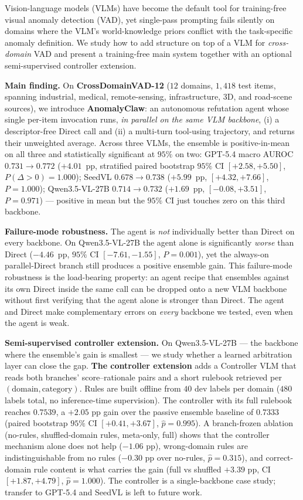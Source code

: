 Vision-language models (VLMs) have become the default tool for training-free visual anomaly detection (VAD), yet single-pass prompting fails silently on domains where the VLM's world-knowledge priors conflict with the task-specific anomaly definition. We study how to add structure on top of a VLM for \emph{cross-domain} VAD and present a training-free main system together with an optional semi-supervised controller extension.

\textbf{Main finding.} On \textbf{CrossDomainVAD-12} ($12$ domains, $1{,}418$ test items, spanning industrial, medical, remote-sensing, infrastructure, 3D, and road-scene sources), we introduce \textbf{AnomalyClaw}: an autonomous refutation agent whose single per-item invocation runs, \emph{in parallel on the same VLM backbone}, (i) a descriptor-free Direct call and (ii) a multi-turn tool-using trajectory, and returns their unweighted average. Across three VLMs, the ensemble is positive-in-mean on all three and statistically significant at $95\%$ on two: GPT-5.4 macro AUROC $0.731\!\to\!0.772$ ($+4.01$~pp, stratified paired bootstrap $95\%$ CI $[+2.58,+5.50]$, $P(\Delta\!>\!0){=}1.000$); SeedVL $0.678\!\to\!0.738$ ($+5.99$~pp, $[+4.32,+7.66]$, $P{=}1.000$); Qwen3.5-VL-27B $0.714\!\to\!0.732$ ($+1.69$~pp, $[-0.08,+3.51]$, $P{=}0.971$) --- positive in mean but the $95\%$ CI just touches zero on this third backbone.

\textbf{Failure-mode robustness.} The agent is \emph{not} individually better than Direct on every backbone. On Qwen3.5-VL-27B the agent alone is significantly \emph{worse} than Direct ($-4.46$~pp, $95\%$ CI $[-7.61,-1.55]$, $P{=}0.001$), yet the always-on parallel-Direct branch still produces a positive ensemble gain. This failure-mode robustness is the load-bearing property: an agent recipe that ensembles against its own Direct inside the same call can be dropped onto a new VLM backbone without first verifying that the agent alone is stronger than Direct. The agent and Direct make complementary errors on \emph{every} backbone we tested, even when the agent is weak.

\textbf{Semi-supervised controller extension.} On Qwen3.5-VL-27B --- the backbone where the ensemble's gain is smallest --- we study whether a learned arbitration layer can close the gap. \textbf{The controller extension} adds a Controller VLM that reads both branches' score--rationale pairs and a short rulebook retrieved per $(\mathrm{domain}, \mathrm{category})$. Rules are built offline from $40$ dev labels per domain ($480$ labels total, no inference-time supervision). The controller with its full rulebook reaches $0.7539$, a $+2.05$ pp gain over the passive ensemble baseline of $0.7333$ (paired bootstrap $95\%$ CI $[+0.41,+3.67]$, $\hat p{=}0.995$). A branch-frozen ablation (no-rules, shuffled-domain rules, meta-only, full) shows that the controller mechanism alone does not help ($-1.06$ pp), wrong-domain rules are indistinguishable from no rules ($-0.30$ pp over no-rules, $\hat p{=}0.315$), and correct-domain rule content is what carries the gain (full vs shuffled $+3.39$ pp, CI $[+1.87,+4.79]$, $\hat p{=}1.000$). The controller is a single-backbone case study; transfer to GPT-5.4 and SeedVL is left to future work.

